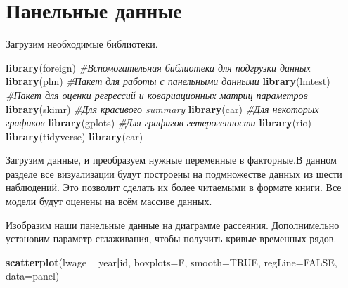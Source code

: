 \documentclass[]{article}
\title{}
\author{}
\date{}
\newenvironment{Shaded}{\begin{snugshade}}{\end{snugshade}}
\newcommand{\CommentTok}[1]{\textcolor[rgb]{0.56,0.35,0.01}{\textit{#1}}}
\newcommand{\DataTypeTok}[1]{\textcolor[rgb]{0.13,0.29,0.53}{#1}}
\newcommand{\KeywordTok}[1]{\textcolor[rgb]{0.13,0.29,0.53}{\textbf{#1}}}
\newcommand{\NormalTok}[1]{#1}
\newcommand{\OperatorTok}[1]{\textcolor[rgb]{0.81,0.36,0.00}{\textbf{#1}}}
\newcommand{\OtherTok}[1]{\textcolor[rgb]{0.56,0.35,0.01}{#1}}
\newcommand{\StringTok}[1]{\textcolor[rgb]{0.31,0.60,0.02}{#1}}
\begin{document}
\hypertarget{paneldata}{%
\section{Панельные данные}\label{paneldata}}

Загрузим необходимые библиотеки.

\begin{Shaded}
\begin{Highlighting}[]
\KeywordTok{library}\NormalTok{(foreign) }\CommentTok{#Вспомогательная библиотека для подгрузки данных}
\KeywordTok{library}\NormalTok{(plm) }\CommentTok{#Пакет для работы с панельными данными}
\KeywordTok{library}\NormalTok{(lmtest) }\CommentTok{#Пакет для оценки регрессий и ковариационных матриц параметров}
\KeywordTok{library}\NormalTok{(skimr) }\CommentTok{#Для красивого summary}
\KeywordTok{library}\NormalTok{(car) }\CommentTok{#Для некоторых графиков}
\KeywordTok{library}\NormalTok{(gplots) }\CommentTok{#Для графигов гетерогенности}
\KeywordTok{library}\NormalTok{(rio)}
\KeywordTok{library}\NormalTok{(tidyverse)}
\KeywordTok{library}\NormalTok{(car)}
\end{Highlighting}
\end{Shaded}

Загрузим данные, и преобразуем нужные переменные в факторные.В данном
разделе все визуализации будут построены на подмножестве данных из шести
наблюдений. Это позволит сделать их более читаемыми в формате книги. Все
модели будут оценены на всём массиве данных.

\begin{Shaded}
\end{Shaded}

Изобразим наши панельные данные на диаграмме рассеяния. Дополнимельно
установим параметр сглаживания, чтобы получить кривые временных рядов.

\begin{Shaded}
\begin{Highlighting}[]
\KeywordTok{scatterplot}\NormalTok{(lwage }\OperatorTok{~}\StringTok{ }\NormalTok{year}\OperatorTok{|}\NormalTok{id, }\DataTypeTok{boxplots=}\NormalTok{F, }\DataTypeTok{smooth=}\OtherTok{TRUE}\NormalTok{, }\DataTypeTok{regLine=}\OtherTok{FALSE}\NormalTok{, }\DataTypeTok{data=}\NormalTok{panel)}
\end{Highlighting}
\end{Shaded}
\end{document}
